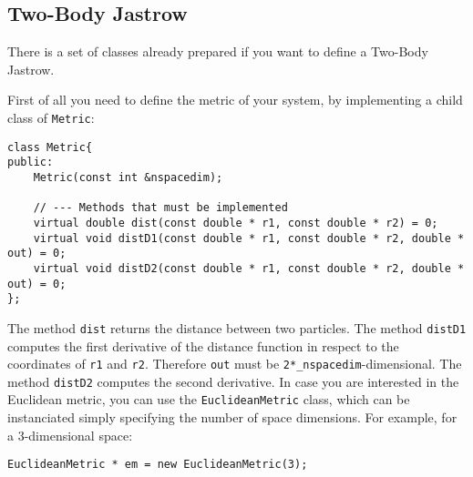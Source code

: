 \documentclass[11pt,a4paper,twoside]{article}
\begin{document}
\subsection{Two-Body Jastrow}
\label{sub:two_body_jastrow}
There is a set of classes already prepared if you want to define a Two-Body Jastrow.

First of all you need to define the metric of your system, by implementing a child class of \verb+Metric+:
\begin{lstlisting}
class Metric{
public:
    Metric(const int &nspacedim);

    // --- Methods that must be implemented
    virtual double dist(const double * r1, const double * r2) = 0;
    virtual void distD1(const double * r1, const double * r2, double * out) = 0;
    virtual void distD2(const double * r1, const double * r2, double * out) = 0;
};
\end{lstlisting}
The method \verb+dist+ returns the distance between two particles.
The method \verb+distD1+ computes the first derivative of the distance function in respect to the coordinates of \verb+r1+ and \verb+r2+.
Therefore \verb+out+ must be \verb+2*_nspacedim+-dimensional.
The method \verb+distD2+ computes the second derivative.
In case you are interested in the Euclidean metric, you can use the \verb+EuclideanMetric+ class, which can be instanciated simply specifying the number of space dimensions. For example, for a $3$-dimensional space:
\begin{lstlisting}
EuclideanMetric * em = new EuclideanMetric(3);
\end{lstlisting}
\end{document}
